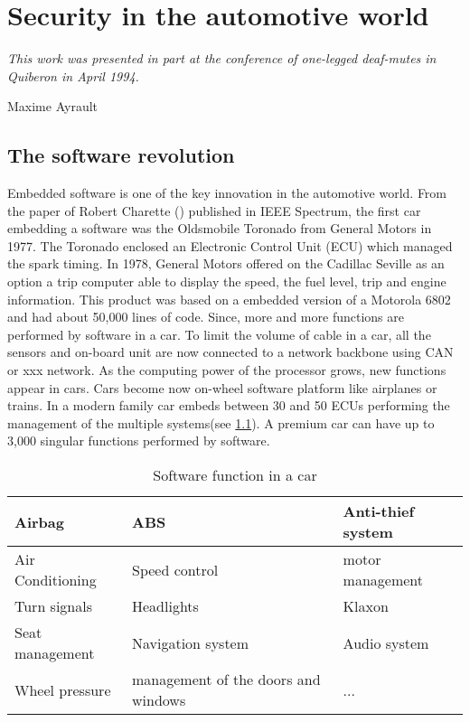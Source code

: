 
\chapter{Security in the automotive world} \label{CHAP2}
\smallskip
\hfill
\begin{minipage}[b]{8cm}
{\it This work was presented in part at the conference of one-legged deaf-mutes in Quiberon in April 1994.}
\end{minipage}
\begin{flushright} Maxime Ayrault \end{flushright}
\vskip 2cm

\section {The software revolution}
\medskip
{\Huge E}mbedded software is one of the key innovation in the automotive world. From the paper of
 Robert Charette (\cite{Cha2009}) published in IEEE Spectrum, the first car embedding a software was the Oldsmobile Toronado from General Motors in 1977. The Toronado enclosed an Electronic Control Unit (ECU) which managed the spark timing. In 1978, General Motors offered on the Cadillac Seville as an option a trip computer able to display the speed, the fuel level, trip and engine information. This product was based on a embedded version of a Motorola 6802 and had about 50,000 lines of code. Since, more and more functions are performed by software in a car. To limit the volume of cable in a car, all the sensors and on-board unit are now connected to a network backbone using CAN or xxx network. As the computing power of the processor grows, new functions appear in cars. Cars become now on-wheel software platform like airplanes or trains. In a modern family car embeds between 30 and 50 ECUs performing the management of the multiple systems(see \ref{tab:soft}). A premium car can have up to 3,000 singular functions performed by software.   

\FloatBarrier
\begin{table}
\centering
\begin{tabular}{| l | l | l |}
\hline
Airbag & ABS & Anti-thief system \\
\hline
Air Conditioning & Speed control & motor management \\
\hline
Turn signals & Headlights & Klaxon \\
\hline
Seat management & Navigation system & Audio system\\
\hline
Wheel pressure & management of the doors and windows & ... \\
\hline
\end{tabular}
\caption{Software function in a car}
\label{tab:soft}
\end{table}
\FloatBarrier


